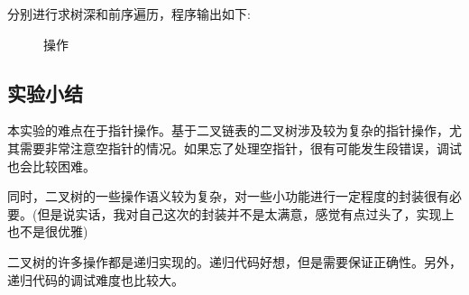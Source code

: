 \documentclass[supercite]{Experimental_Report}
\theoremstyle{definition}
\begin{document}
\clearpage
\noindent
分别进行求树深和前序遍历，程序输出如下:
\begin{figure}[htbp]
	\centering
	\vspace{2pt}
	\centering
	\caption{操作}
	\label{fig5-101}
\end{figure}

\newpage

\subsection{实验小结}

本实验的难点在于指针操作。基于二叉链表的二叉树涉及较为复杂的指针操作，尤其需要非常注意空指针的情况。如果忘了处理空指针，很有可能发生段错误，调试也会比较困难。

同时，二叉树的一些操作语义较为复杂，对一些小功能进行一定程度的封装很有必要。(但是说实话，我对自己这次的封装并不是太满意，感觉有点过头了，实现上也不是很优雅)

二叉树的许多操作都是递归实现的。递归代码好想，但是需要保证正确性。另外，递归代码的调试难度也比较大。
\end{document}
